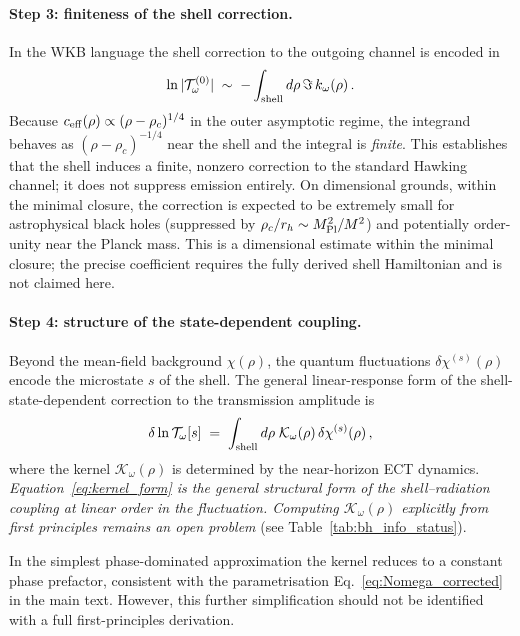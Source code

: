 \documentclass[11pt,a4paper]{article}
\numberwithin{equation}{section}
\begin{document}
\paragraph{Step 3: finiteness of the shell correction.}

In the WKB language the shell correction to the outgoing channel is encoded in
\begin{equation}
\ln |\mathcal{T}_\omega^{(0)}|
\;\sim\;
-\int_{\rm shell} d\rho\,\Im\,k_\omega(\rho)\,.
\label{eq:WKB_shell}
\end{equation}
Because $c_{\rm eff}(\rho)\propto(\rho-\rho_c)^{1/4}$ in the outer asymptotic
regime, the integrand behaves as $(\rho-\rho_c)^{-1/4}$ near the shell and the
integral is \emph{finite}.
This establishes that the shell induces a finite, nonzero correction to
the standard Hawking channel; it does not suppress emission entirely.
On dimensional grounds, within the minimal closure, the correction is
expected to be extremely small for astrophysical black holes
(suppressed by $\rho_c/r_h \sim M_{\rm Pl}^2/M^2$) and potentially
order-unity near the Planck mass.
This is a dimensional estimate within the minimal closure;
the precise coefficient requires the fully derived shell Hamiltonian
and is not claimed here.

\paragraph{Step 4: structure of the state-dependent coupling.}

Beyond the mean-field background $\chi(\rho)$, the quantum fluctuations
$\delta\chi^{(s)}(\rho)$ encode the microstate $s$ of the shell.
The general linear-response form of the shell-state-dependent correction to
the transmission amplitude is
\begin{equation}
\delta\ln \mathcal{T}_\omega[s]
\;=\;
\int_{\rm shell} d\rho\;
\mathcal{K}_\omega(\rho)\,\delta\chi^{(s)}(\rho)\,,
\label{eq:kernel_form}
\end{equation}
where the kernel $\mathcal{K}_\omega(\rho)$ is determined by the near-horizon
ECT dynamics.
\textit{Equation~\eqref{eq:kernel_form} is the general structural form of the
shell--radiation coupling at linear order in the fluctuation.
Computing $\mathcal{K}_\omega(\rho)$ explicitly from first principles remains
an open problem} (see Table~\ref{tab:bh_info_status}).

In the simplest phase-dominated approximation the kernel reduces to a constant
phase prefactor, consistent with the parametrisation
Eq.~\eqref{eq:Nomega_corrected} in the main text.
However, this further simplification should not be identified with a
full first-principles derivation.
\end{document}
